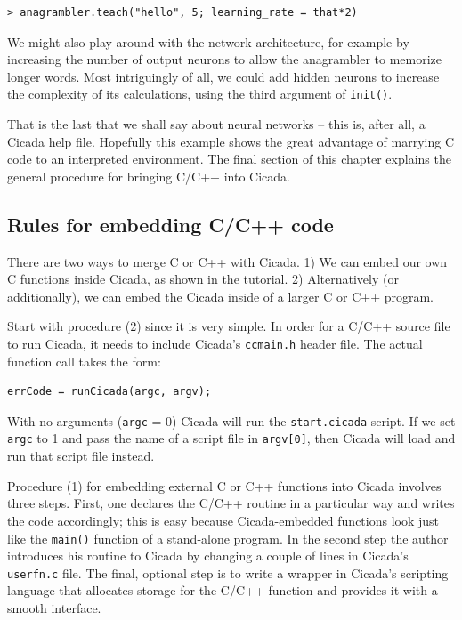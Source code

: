 \documentclass{article}
\newenvironment{code}{
       \begin{list}{}{
               \setlength{\leftmargin}{.4in}
               \setlength{\rightmargin}{0in}
               \setlength{\topsep}{.2in}
       }
       \small
       \item[] }
       { \end{list}   }
\begin{document}
\begin{code} \begin{verbatim}
> anagrambler.teach("hello", 5; learning_rate = that*2)
\end{verbatim} \end{code}

\noindent We might also play around with the network architecture, for example by increasing the number of output neurons to allow the anagrambler to memorize longer words.  Most intriguingly of all, we could add hidden neurons to increase the complexity of its calculations, using the third argument of \verb#init()#.

That is the last that we shall say about neural networks -- this is, after all, a Cicada help file.  Hopefully this example shows the great advantage of marrying C code to an interpreted environment.  The final section of this chapter explains the general procedure for bringing C/C++ into Cicada.




\subsection{Rules for embedding C/C++ code}

There are two ways to merge C or C++ with Cicada.  1) We can embed our own C functions inside Cicada, as shown in the tutorial.  2) Alternatively (or additionally), we can embed the Cicada inside of a larger C or C++ program.

Start with procedure (2) since it is very simple.  In order for a C/C++ source file to run Cicada, it needs to include Cicada's \verb#ccmain.h# header file.  The actual function call takes the form:

\begin{code} \begin{verbatim}
errCode = runCicada(argc, argv);
\end{verbatim} \end{code}

\noindent With no arguments (\verb#argc# = 0) Cicada will run the \verb#start.cicada# script.  If we set \verb#argc# to 1 and pass the name of a script file in \verb#argv[0]#, then Cicada will load and run that script file instead.

Procedure (1) for embedding external C or C++ functions into Cicada involves three steps.  First, one declares the C/C++ routine in a particular way and writes the code accordingly; this is easy because Cicada-embedded functions look just like the \verb#main()# function of a stand-alone program.  In the second step the author introduces his routine to Cicada by changing a couple of lines in Cicada's \verb#userfn.c# file.  The final, optional step is to write a wrapper in Cicada's scripting language that allocates storage for the C/C++ function and provides it with a smooth interface.
\end{document}
